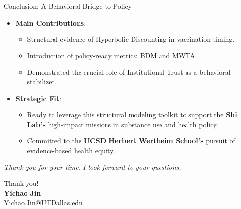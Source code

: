 \documentclass[10pt]{beamer}
\begin{document}
\begin{frame}{Conclusion: A Behavioral Bridge to Policy}
    \begin{itemize}
        \item \textbf{Main Contributions}:
            \begin{itemize}
                \item Structural evidence of \alert{Hyperbolic Discounting} in vaccination timing.
                \item Introduction of policy-ready metrics: \alert{BDM} and \alert{MWTA}.
                \item Demonstrated the crucial role of \alert{Institutional Trust} as a behavioral stabilizer.
            \end{itemize}
        \item \textbf{Strategic Fit}:
            \begin{itemize}
                \item Ready to leverage this structural modeling toolkit to support the \textbf{Shi Lab’s} high-impact missions in substance use and health policy.
                \item Committed to the \textbf{UCSD Herbert Wertheim School’s} pursuit of evidence-based health equity.
            \end{itemize}
    \end{itemize}
    \vfill
    \begin{center}
        \small \textit{Thank you for your time. I look forward to your questions.}
    \end{center}
\end{frame}

\begin{frame}[standout]
    \centering
    {\Huge Thank you!}\\
    \vspace{1.5em}
    \textbf{Yichao Jin}\\
    \small Yichao.Jin@UTDallas.edu
\end{frame}
\end{document}
